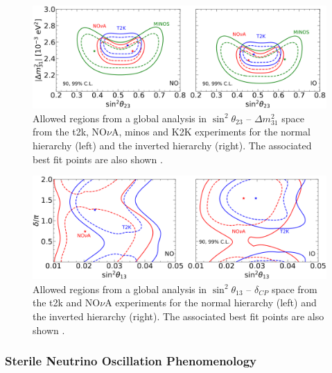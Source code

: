 \begin{figure}[h!]
    \centering
    \includegraphics[width = \largefigwidth]{figures-chap2/theta_23_1.png}   
    \caption[Allowed regions in $\sin^2{\theta_{23}}$ -- $\Delta m^2_{31}$ space from the \gls{t2k}, NO$\nu$A, \gls{minos} and K2K experiments.]{Allowed regions from a global analysis in $\sin^2{\theta_{23}}$ -- $\Delta m^2_{31}$ space from the \gls{t2k}, NO$\nu$A, \gls{minos} and K2K experiments for the normal hierarchy (left) and the inverted hierarchy (right). The associated best fit points are also shown
    \cite{2020_global_reassessment_of_the_neutrino_oscillation_picture}.}
    \label{fig:t2k_nova_minos_k2k}
\end{figure}

\begin{figure}[h!]
    \centering
    \includegraphics[width = \largefigwidth]{figures-chap2/CP.png}
    \caption[Allowed regions in $\sin^2{\theta_{13}}$ -- $\delta_{CP}$ space from the \gls{t2k} and NO$\nu$A experiments.]{Allowed regions from a global analysis in $\sin^2{\theta_{13}}$ -- $\delta_{CP}$ space from the \gls{t2k} and NO$\nu$A experiments for the normal hierarchy (left) and the inverted hierarchy (right). The associated best fit points are also shown
    \cite{2020_global_reassessment_of_the_neutrino_oscillation_picture}.}
    \label{fig:t2k_nova_CP}
\end{figure}

\newpage
\subsubsection{Sterile Neutrino Oscillation Phenomenology}

